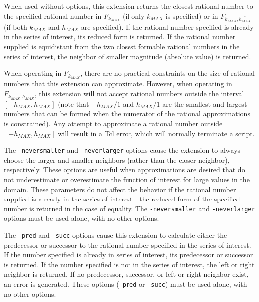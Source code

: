 \begin{tclcommanddescription}
When used without options, this extension returns the closest rational
number to the specified rational number in $F_{k_{MAX}}$ (if only $k_{MAX}$ is
specified) or in  $F_{k_{MAX}, \overline{h_{MAX}}}$ (if both 
$k_{MAX}$ and $h_{MAX}$ are specified).  If the rational number specified
is already in the series of interest, its reduced form is returned.
If the rational number supplied is equidistant from the two closest
formable rational numbers in the series of interest, the neighbor of smaller 
magnitude (absolute value) is returned.

When operating in $F_{k_{MAX}}$, there are no practical constraints 
on the size of rational numbers that this extension can approximate.
However, when operating in $F_{k_{MAX}, \overline{h_{MAX}}}$,
this extension will not accept rational numbers outside the
interval $[-h_{MAX}, h_{MAX}]$ (note that $-h_{MAX}/1$ and
$h_{MAX}/1$ are the smallest and largest numbers that can be formed
when the numerator of the rational approximations is constrained).
Any attempt to approximate a rational number outside $[-h_{MAX}, h_{MAX}]$
will result in a Tcl error, which will normally terminate a script.

The \texttt{-neversmaller} and \texttt{-neverlarger}
options cause the extension to always choose the larger and
smaller neighbors (rather than the closer neighbor), respectively.
These options are useful when approximations are desired that 
do not underestimate or overestimate the function of interest for
large values in the domain.  These parameters do not affect
the behavior if the rational number supplied is already in the
series of interest---the reduced form of the specified number
is returned in the case of equality.
The \texttt{-neversmaller} and \texttt{-neverlarger} options
must be used alone, with no other options.

The \texttt{-pred} and \texttt{-succ} options cause this extension
to calculate either the predecessor or successor to the rational
number specified in the series of interest.  If the number specified
is already in series of interest, its predecessor or successor 
is returned. 
If the number specified is not in the series of interest,
the left or right neighbor is returned.  If no predecessor,
successor, or left or right neighbor exist, an error is generated.
These options (\texttt{-pred} or \texttt{-succ})
must be used alone, with no other options.


\end{tclcommanddescription}
